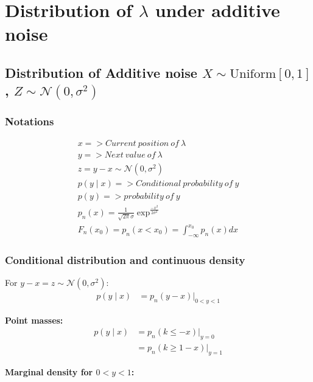\section{Distribution of $\lambda$ under additive noise}\label{AdditiveStationary}
\subsection*{Distribution of Additive noise $X \sim \mathrm{Uniform}[0,1]$, $Z \sim \mathcal{N}(0,\sigma^2)$}
\subsubsection{Notations}
\begin{align*}
    x => Current\ position \ of\ \lambda\\
    y => Next\ value\ of\ \lambda\\
    z = y-x \sim \mathcal{N}(0,\sigma^2)\\
    p(y\mid x) => Conditional\ probability\ of\ y\\
    p(y) => probability\ of\ y\\
    p_n(x) = \frac{1}{\sqrt{2\pi}\sigma}\exp^{\frac{-x^2}{2\sigma^2}}\\
    F_n(x_0) = p_n(x < x_0) = \int_{-\infty}^{x_0}p_n(x)dx
\end{align*}
\subsubsection*{Conditional distribution and continuous density}

For $y - x = z \sim \mathcal{N}(0,\sigma^2)$:
\begin{align*}
p(y \mid x) &= p_n(y - x)\big|_{0 < y < 1}
\end{align*}

\textbf{Point masses:}
\begin{align*}
p(y \mid x) &= p_n(k \leq -x)\big|_{y=0} \\
             &= p_n(k \geq 1 - x)\big|_{y=1}
\end{align*}

\textbf{Marginal density for $0 < y < 1$:}

